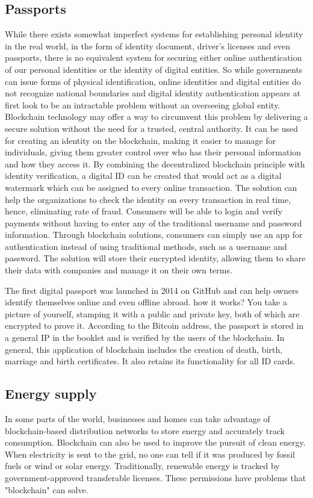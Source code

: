 \subsection{Passports}
While there exists somewhat imperfect systems for establishing personal identity in the real
world, in the form of identity document, driver’s licenses and even passports, there is no
equivalent system for securing either online authentication of our personal identities or the
identity of digital entities. So while governments can issue forms of physical identification, online
identities and digital entities do not recognize national boundaries and digital identity
authentication appears at first look to be an intractable problem without an overseeing global
entity.
Blockchain technology may offer a way to circumvent this problem by delivering a secure
solution without the need for a trusted, central authority. It can be used for creating an identity on
the blockchain, making it easier to manage for individuals, giving them greater control over who
has their personal information and how they access it.
By combining the decentralized blockchain principle with identity verification, a digital ID can be
created that would act as a digital watermark which can be assigned to every online transaction.
The solution can help the organizations to check the identity on every transaction in real time,
hence, eliminating rate of fraud. Consumers will be able to login and verify payments without
having to enter any of the traditional username and password information. Through blockchain
solutions, consumers can simply use an app for authentication instead of using traditional
methods, such as a username and password. The solution will store their encrypted identity,
allowing them to share their data with companies and manage it on their own terms.\textcite{jacobovitz2016blockchain}

The first digital passport was launched in 2014 on GitHub and can help owners identify themselves online and even offline abroad. how it works? You take a picture of yourself, stamping it with a public and private key, both of which are encrypted to prove it. According to the Bitcoin address, the passport is stored in a general IP in the booklet and is verified by the users of the blockchain.
In general, this application of blockchain includes the creation of death, birth, marriage and birth certificates. It also retains its functionality for all ID cards.

\subsection{Energy supply}
In some parts of the world, businesses and homes can take advantage of blockchain-based distribution networks to store energy and accurately track consumption. Blockchain can also be used to improve the pursuit of clean energy. When electricity is sent to the grid, no one can tell if it was produced by fossil fuels or wind or solar energy.
Traditionally, renewable energy is tracked by government-approved transferable licenses. These permissions have problems that "blockchain" can solve.

